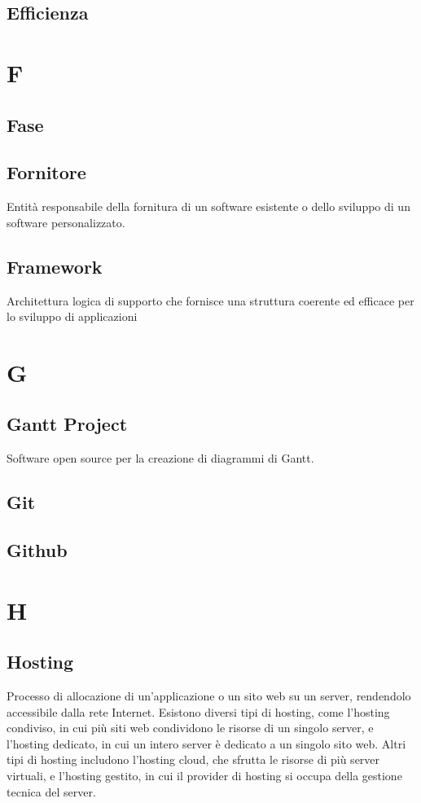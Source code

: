 \documentclass[12pt]{article}
\begin{document}
		\subsection{Efficienza}
	\clearpage
	\section{F}
		\subsection{Fase}

		\subsection{Fornitore}
		Entità responsabile della fornitura di un software esistente o dello sviluppo di un software personalizzato.
		\subsection{Framework} %
		Architettura logica di supporto che fornisce una struttura coerente ed efficace per lo sviluppo di applicazioni

	\clearpage
	\section{G}
		\subsection{Gantt Project}
		 Software open source per la creazione di diagrammi di Gantt.
		\subsection{Git}


		\subsection{Github}
	\clearpage
	\section{H}
		\subsection{Hosting}
		Processo di allocazione di un'applicazione o un sito web su un server, rendendolo accessibile dalla rete Internet. Esistono diversi tipi di hosting, come l'hosting condiviso, in cui più siti web condividono le risorse di un singolo server, e l'hosting dedicato, in cui un intero server è dedicato a un singolo sito web. Altri tipi di hosting includono l'hosting cloud, che sfrutta le risorse di più server virtuali, e l'hosting gestito, in cui il provider di hosting si occupa della gestione tecnica del server.
		
\end{document}
